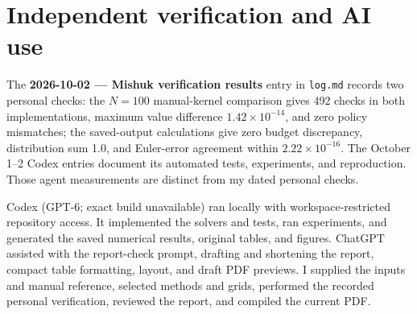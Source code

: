 \documentclass[10pt]{article}
\begin{document}
\section{Independent verification and AI use}
The \textbf{2026-10-02 --- Mishuk verification results} entry in \texttt{log.md}
records two personal checks: the $N=100$ manual-kernel comparison gives 492 checks
in both implementations, maximum value difference $1.42\times10^{-14}$, and zero
policy mismatches; the saved-output calculations give zero budget discrepancy,
distribution sum 1.0, and Euler-error agreement within $2.22\times10^{-16}$.
The October 1--2 Codex entries document its automated tests, experiments, and
reproduction. Those agent measurements are distinct from my dated personal checks.

Codex (GPT-6; exact build unavailable) ran locally with workspace-restricted repository access. 
It implemented the solvers and tests, ran experiments, and generated the saved numerical results, 
original tables, and figures. ChatGPT assisted with the report-check prompt, drafting and shortening 
the report, compact table formatting, layout, and draft PDF previews. I supplied the inputs and manual 
reference, selected methods and grids, performed the recorded personal verification, reviewed the report, 
and compiled the current PDF.

\clearpage
\appendix
\end{document}
